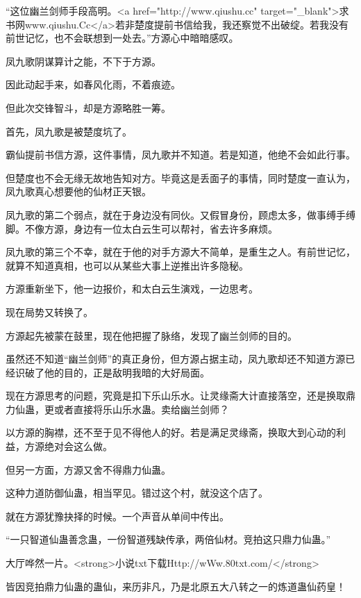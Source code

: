 
\begin{this_body}

“这位幽兰剑师手段高明。<a href="http://www.qiushu.cc" target="\_blank">求书网www.qiushu.Cc</a>若非楚度提前书信给我，我还察觉不出破绽。若我没有前世记忆，也不会联想到一处去。”方源心中暗暗感叹。

凤九歌阴谋算计之能，不下于方源。

因此动起手来，如春风化雨，不着痕迹。

但此次交锋智斗，却是方源略胜一筹。

首先，凤九歌是被楚度坑了。

霸仙提前书信方源，这件事情，凤九歌并不知道。若是知道，他绝不会如此行事。

但楚度也不会无缘无故地告知对方。毕竟这是丢面子的事情，同时楚度一直认为，凤九歌真心想要他的仙材正天银。

凤九歌的第二个弱点，就在于身边没有同伙。又假冒身份，顾虑太多，做事缚手缚脚。不像方源，身边有一位太白云生可以帮衬，省去许多麻烦。

凤九歌的第三个不幸，就在于他的对手方源大不简单，是重生之人。有前世记忆，就算不知道真相，也可以从某些大事上逆推出许多隐秘。

方源重新坐下，他一边报价，和太白云生演戏，一边思考。

现在局势又转换了。

方源起先被蒙在鼓里，现在他把握了脉络，发现了幽兰剑师的目的。

虽然还不知道“幽兰剑师”的真正身份，但方源占据主动，凤九歌却还不知道方源已经识破了他的目的，正是敌明我暗的大好局面。

现在方源思考的问题，究竟是扣下乐山乐水。让灵缘斋大计直接落空，还是换取鼎力仙蛊，更或者直接将乐山乐水蛊。卖给幽兰剑师？

以方源的胸襟，还不至于见不得他人的好。若是满足灵缘斋，换取大到心动的利益，方源绝对会这么做。

但另一方面，方源又舍不得鼎力仙蛊。

这种力道防御仙蛊，相当罕见。错过这个村，就没这个店了。

就在方源犹豫抉择的时候。一个声音从单间中传出。

“一只智道仙蛊善念蛊，一份智道残缺传承，两倍仙材。竞拍这只鼎力仙蛊。”

大厅哗然一片。<strong>小说txt下载Http://wWw.80txt.com/</strong>

皆因竞拍鼎力仙蛊的蛊仙，来历非凡，乃是北原五大八转之一的炼道蛊仙药皇！


\end{this_body}
